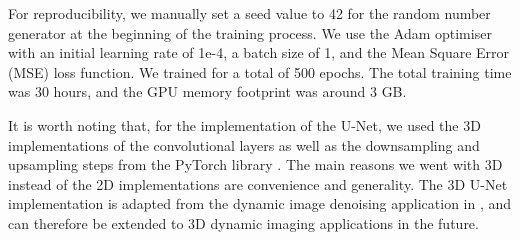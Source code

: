 \documentclass[12pt]{article}
\begin{document}
For reproducibility, we manually set a seed value to 42 for the random number generator at the beginning of the training process. We use the Adam optimiser with an initial learning rate of 1e-4, a batch size of 1, and the Mean Square Error (MSE) loss function. We trained for a total of 500 epochs. The total training time was 30 hours, and the GPU memory footprint was around 3 GB.

It is worth noting that, for the implementation of the U-Net, 
we used the 3D implementations of the convolutional layers as well as the downsampling and upsampling steps from the PyTorch library \cite{NEURIPS2019_9015}.
The main reasons we went with 3D instead of the 2D implementations are convenience and generality.
The 3D U-Net implementation is adapted from the dynamic image denoising application in \cite{kofler2023learning}, and can therefore be extended to 3D dynamic imaging applications in the future.



    








\end{document}
